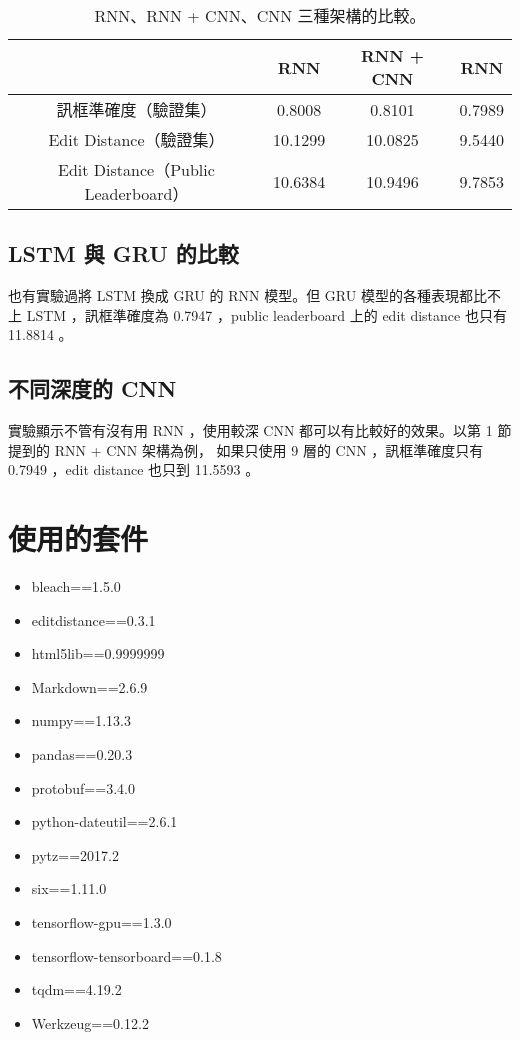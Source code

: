 \documentclass[fleqn,a4paper,12pt]{article}
\begin{document}
\begin{table}
  \centering
  \begin{tabular}[H]{ | c | c | c | c | }
    \hline
    & RNN & RNN + CNN & RNN \\
    \hline
    訊框準確度（驗證集） & 0.8008 & 0.8101 & 0.7989 \\
    \hline
    Edit Distance（驗證集） & 10.1299 & 10.0825 & 9.5440 \\
    \hline
    Edit Distance（Public Leaderboard） & 10.6384 & 10.9496 & 9.7853 \\  
    \hline
  \end{tabular}
  \caption{RNN、RNN + CNN、CNN 三種架構的比較。}
  \label{tab:rnn_rnncnn_cnn_cmp}
\end{table}

\subsection{LSTM 與 GRU 的比較}

也有實驗過將 LSTM 換成 GRU 的 RNN 模型。但 GRU 模型的各種表現都比不上 LSTM ，訊框準確度為 0.7947 ，public leaderboard 上的 edit distance 也只有 11.8814 。

\subsection{不同深度的 CNN}

實驗顯示不管有沒有用 RNN ，使用較深 CNN 都可以有比較好的效果。以第 1 節提到的 RNN + CNN 架構為例， 如果只使用 9 層的 CNN ，訊框準確度只有 0.7949 ，edit distance 也只到 11.5593 。


\clearpage
\appendix

\section{使用的套件}

\begin{itemize}
\item bleach==1.5.0
\item editdistance==0.3.1
\item html5lib==0.9999999
\item Markdown==2.6.9
\item numpy==1.13.3
\item pandas==0.20.3
\item protobuf==3.4.0
\item python-dateutil==2.6.1
\item pytz==2017.2
\item six==1.11.0
\item tensorflow-gpu==1.3.0
\item tensorflow-tensorboard==0.1.8
\item tqdm==4.19.2
\item Werkzeug==0.12.2
\end{itemize}
\end{document}
